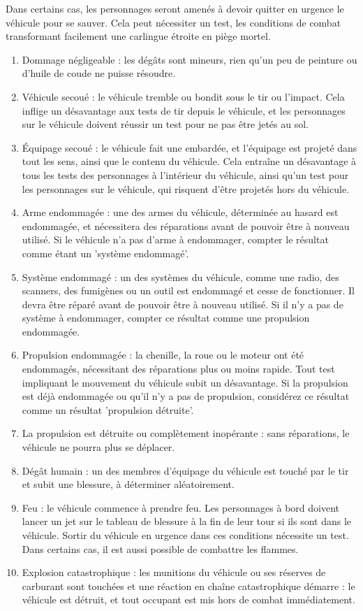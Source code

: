 \documentclass{report}
\begin{document}
\begin{multicols}{2}
Dans certains cas, les personnages seront amenés à devoir quitter en urgence le véhicule pour se sauver. Cela peut nécessiter un test, les conditions de combat transformant facilement une carlingue étroite en piège mortel.
\begin{enumerate}
    \item Dommage négligeable : les dégâts sont mineurs, rien qu'un peu de peinture ou d'huile de coude ne puisse résoudre.
    \item Véhicule secoué : le véhicule tremble ou bondit sous le tir ou l'impact. Cela inflige un désavantage aux tests de tir depuis le véhicule, et les personnages sur le véhicule doivent réussir un test pour ne pas être jetés au sol.
    \item Équipage secoué : le véhicule fait une embardée, et l'équipage est projeté dans tout les sens, ainsi que le contenu du véhicule. Cela entraîne un désavantage à tous les tests des personnages à l'intérieur du véhicule, ainsi qu'un test pour les personnages sur le véhicule, qui risquent d'être projetés hors du véhicule.
    \item Arme endommagée : une des armes du véhicule, déterminée au hasard est endommagée, et nécessitera des réparations avant de pouvoir être à nouveau utilisé. Si le véhicule n'a pas d'arme à endommager, compter le résultat comme étant un 'système endommagé'.
    \item Système endommagé : un des systèmes du véhicule, comme une radio, des scanners, des fumigènes ou un outil est endommagé et cesse de fonctionner. Il devra être réparé avant de pouvoir être à nouveau utilisé. Si il n'y a pas de système à endommager, compter ce résultat comme une propulsion endommagée.
    \item Propulsion endommagée : la chenille, la roue ou le moteur ont été endommagés, nécessitant des réparations plus ou moins rapide. Tout test impliquant le mouvement du véhicule subit un désavantage. Si la propulsion est déjà endommagée ou qu'il n'y a pas de propulsion, considérez ce résultat comme un résultat 'propulsion détruite'.
    \item La propulsion est détruite ou complètement inopérante : sans réparations, le véhicule ne pourra plus se déplacer.
    \item Dégât humain : un des membres d'équipage du véhicule est touché par le tir et subit une blessure, à déterminer aléatoirement.
    \item Feu : le véhicule commence à prendre feu. Les personnages à bord doivent lancer un jet sur le tableau de blessure à la fin de leur tour si ils sont dans le véhicule. Sortir du véhicule en urgence dans ces conditions nécessite un test. Dans certains cas, il est aussi possible de combattre les flammes.
    \item Explosion catastrophique : les munitions du véhicule ou ses réserves de carburant sont touchées et une réaction en chaîne catastrophique démarre : le véhicule est détruit, et tout occupant est mis hors de combat immédiatement.
\end{enumerate}


\end{multicols}
\end{document}
